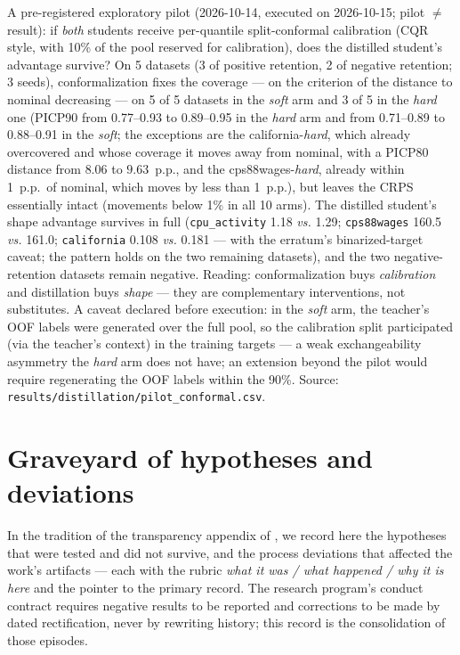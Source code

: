 A pre-registered exploratory pilot (2026-10-14, executed on 2026-10-15;
pilot $\neq$ result): if \emph{both} students receive per-quantile
split-conformal calibration (CQR style, with 10\% of the pool
reserved for calibration), does the distilled student's advantage
survive? On 5 datasets (3 of positive retention, 2 of negative
retention; 3 seeds),
conformalization fixes the coverage --- on the criterion of the
distance to nominal decreasing --- on 5 of 5 datasets in the
\emph{soft} arm and 3 of 5 in the \emph{hard} one (PICP90 from
0.77--0.93 to 0.89--0.95 in the \emph{hard} arm and from 0.71--0.89
to 0.88--0.91 in the \emph{soft}; the exceptions are the
california-\emph{hard}, which already overcovered and whose coverage
it moves away from nominal, with a PICP80 distance from $8.06$ to
$9.63$~p.p., and the cps88wages-\emph{hard}, already within 1~p.p.\
of nominal, which moves by less than 1~p.p.), but leaves the CRPS
essentially intact (movements below 1\% in all 10 arms). The
distilled student's shape advantage survives in full
(\texttt{cpu\_activity} 1.18 \emph{vs.} 1.29; \texttt{cps88wages}
160.5 \emph{vs.} 161.0; \texttt{california} 0.108 \emph{vs.} 0.181
--- with the erratum's binarized-target caveat; the pattern holds on
the two remaining datasets), and the two negative-retention datasets remain negative.
Reading: conformalization buys \emph{calibration} and distillation
buys \emph{shape} --- they are complementary interventions, not
substitutes. A caveat declared before execution: in the \emph{soft}
arm, the teacher's OOF labels were generated over the full pool, so
the calibration split participated (via the teacher's context) in
the training targets --- a weak exchangeability asymmetry the
\emph{hard} arm does not have; an extension beyond the pilot would
require regenerating the OOF labels within the 90\%. Source:
\texttt{results/\allowbreak distillation/\allowbreak pilot\_\allowbreak conformal.\allowbreak csv}.

\section{Graveyard of hypotheses and deviations}
\label{sec:suple-cemiterio}

In the tradition of the transparency appendix of
\citet{grinsztajn2022}, we record here the hypotheses that were
tested and did not survive, and the process deviations that affected
the work's artifacts --- each with the rubric \emph{what it was /
what happened / why it is here} and the pointer to the primary
record. The research program's conduct contract requires negative
results to be reported and corrections to be made by dated
rectification, never by rewriting history; this record is the
consolidation of those episodes.


